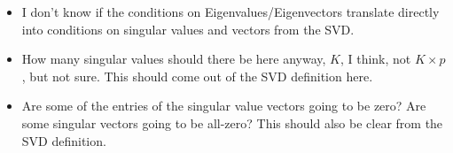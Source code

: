 \begin{itemize}
\item I don't know if the conditions on Eigenvalues/Eigenvectors
translate directly into conditions on singular values and vectors from
the SVD.
\item How many singular values should there be here anyway, $K$, I
think, not $K\times p$, but not sure.  This should come out of the SVD
definition here.
\item Are some of the entries of the singular value vectors going to be
zero?  Are some singular vectors going to be all-zero? This should also
be clear from the SVD definition.
\end{itemize}

